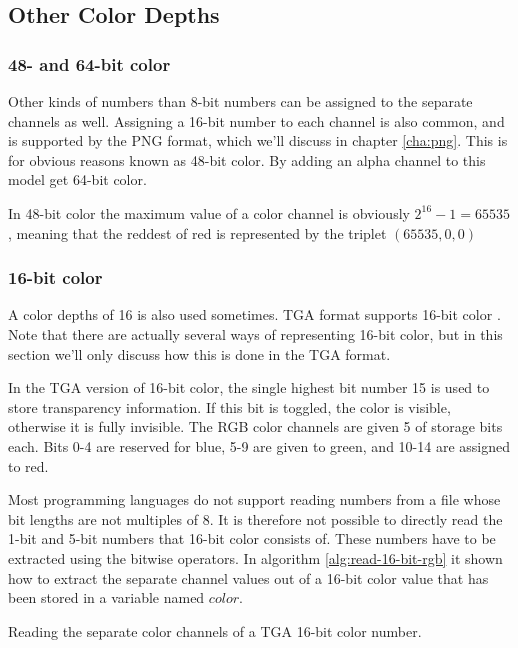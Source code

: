 \subsection{Other Color Depths}
\label{sec:other-channel-sizes}

\subsubsection{48- and 64-bit color}

Other kinds of numbers than 8-bit numbers can be assigned to the
separate channels as well. Assigning a 16-bit number to each channel
is also common, and is supported by the PNG
format\cite{boutel:_png_portab_networ_graph_specif_version12}, which
we'll discuss in chapter \ref{cha:png}. This is for obvious reasons
known as 48-bit color. By adding an alpha channel to this model get
64-bit color.

In 48-bit color the maximum value of a color channel is obviously
$2^{16} - 1 = 65535$, meaning that the reddest of red is represented
by the triplet $(65535, 0, 0)$

\subsubsection{16-bit color}

A color depths of 16 is also used sometimes. TGA format supports
16-bit color \cite{91:_truev_tga_file_format_specif}. Note that there
are actually several ways of representing 16-bit color, but in this
section we'll only discuss how this is done in the TGA format.

In the TGA version of 16-bit color, the single highest bit number 15
is used to store transparency information. If this bit is toggled, the
color is visible, otherwise it is fully invisible. The RGB color
channels are given 5 of storage bits each. Bits 0-4 are reserved for
blue, 5-9 are given to green, and 10-14 are assigned to red.

Most programming languages do not support reading numbers from a file
whose bit lengths are not multiples of 8. It is therefore not possible
to directly read the 1-bit and 5-bit numbers that 16-bit color
consists of. These numbers have to be extracted using the bitwise
operators. In algorithm \ref{alg:read-16-bit-rgb} it shown how to
extract the separate channel values out of a 16-bit color value that
has been stored in a variable named $color$.

\begin{algorithm}[H]
  \caption{Reading the separate color channels of a TGA 16-bit color
    number.}
  \label{alg:read-16-bit-rgb}
  \begin{algorithmic}[1]
  \end{algorithmic}
\end{algorithm}

